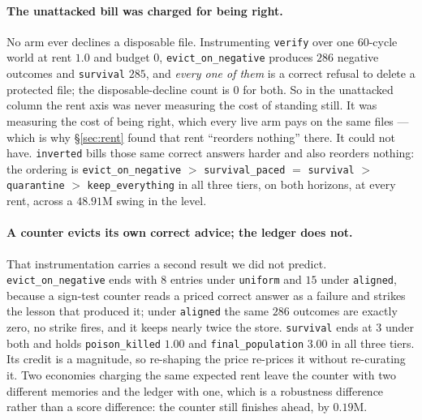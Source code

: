 \paragraph{The unattacked bill was charged for being right.} No arm ever
declines a disposable file. Instrumenting \texttt{verify} over one
60-cycle world at rent $1.0$ and budget 0, \texttt{evict\_on\_negative}
produces $286$ negative outcomes and \texttt{survival} $285$, and
\emph{every one of them} is a correct refusal to delete a protected
file; the disposable-decline count is $0$ for both. So in the unattacked
column the rent axis was never measuring the cost of standing still. It
was measuring the cost of being right, which every live arm pays on the
same files --- which is why \S\ref{sec:rent} found that rent
``reorders nothing'' there. It could not have. \texttt{inverted} bills
those same correct answers harder and also reorders nothing: the
ordering is \texttt{evict\_on\_negative} $>$ \texttt{survival\_paced} $=$
\texttt{survival} $>$ \texttt{quarantine} $>$ \texttt{keep\_everything}
in all three tiers, on both horizons, at every rent, across a $48.91$M
swing in the level.

\paragraph{A counter evicts its own correct advice; the ledger does
not.} That instrumentation carries a second result we did not predict.
\texttt{evict\_on\_negative} ends with $8$ entries under \texttt{uniform}
and $15$ under \texttt{aligned}, because a sign-test counter reads a
priced correct answer as a failure and strikes the lesson that produced
it; under \texttt{aligned} the same $286$ outcomes are exactly zero, no
strike fires, and it keeps nearly twice the store. \texttt{survival}
ends at $3$ under both and holds \texttt{poison\_killed} $1.00$ and
\texttt{final\_population} $3.00$ in all three tiers. Its credit is a
magnitude, so re-shaping the price re-prices it without re-curating it.
Two economies charging the same expected rent leave the counter with two
different memories and the ledger with one, which is a robustness
difference rather than a score difference: the counter still finishes
ahead, by $0.19$M.

